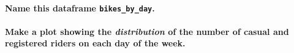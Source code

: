 \documentclass[11pt]{article}
\begin{document}
\paragraph{\texorpdfstring{Name this dataframe
\texttt{bikes\_by\_day}.}{Name this dataframe bikes\_by\_day.}}\label{name-this-dataframe-bikes_by_day.}

\paragraph{\texorpdfstring{Make a plot showing the \emph{distribution}
of the number of casual and registered riders on each day of the
week.}{Make a plot showing the distribution of the number of casual and registered riders on each day of the week.}}\label{make-a-plot-showing-the-distribution-of-the-number-of-casual-and-registered-riders-on-each-day-of-the-week.}
\end{document}
